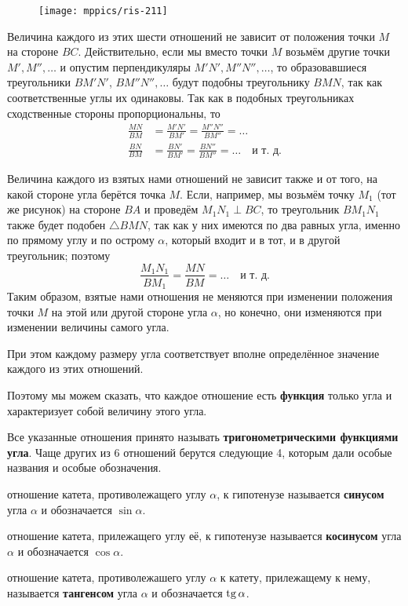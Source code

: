 \documentclass[oneside]{book}
\begin{document}
\begin{figure}
\centering
\texttt{[image: mppics/ris-211]}
\caption{}\label{1938/ris-211}
\end{figure}

Величина каждого из этих шести отношений не зависит от положения точки $M$ на стороне $BC$.
Действительно, если мы вместо точки $M$ возьмём другие точки $M', M'',\dots$
и опустим перпендикуляры $M'N', M''N'',\dots$, то образовавшиеся треугольники $BM'N'$,  $BM''N'',\dots$
будут подобны треугольнику $BMN$, так как соответственные углы их одинаковы.
Так как в подобных треугольниках сходственные стороны пропорциональны, то 
\begin{align*}
\frac{MN}{BM}&=\frac{M'N'}{BM'}=\frac{M''N''}{BM''}=\dots
\\
\frac{BN}{BM}&=\frac{BN'}{BM'}=\frac{BN''}{BM''}=\dots\quad\text{и т.~д.}
\end{align*}


Величина каждого из взятых нами отношений не зависит также и от того, на какой стороне угла берётся точка $M$.
Если, например, мы возьмём точку $M_1$ (тот же рисунок) на стороне $BA$ и проведём $M_1N_1\perp BC$, то треугольник $BM_1N_1$ также будет подобен $\triangle BMN$, так как у них имеются по два равных угла, именно по прямому углу и по острому $\alpha$, который входит и в тот, и в другой треугольник;
поэтому
\[\frac{M_1N_1}{BM_1}=\frac{MN}{BM}=\dots\quad\text{и т.~д.}\]
Таким образом, взятые нами отношения не меняются при изменении положения точки $M$ на этой или другой стороне угла $\alpha$, но конечно, они изменяются при изменении величины самого угла.

При этом каждому размеру угла соответствует вполне определённое значение каждого из этих отношений.

Поэтому мы можем сказать, что каждое отношение есть \textbf{функция} только угла и характеризует собой величину этого угла.

Все указанные отношения принято называть \textbf{тригонометрическими функциями угла}.
Чаще других из 6 отношений берутся следующие 4, которым дали особые названия и особые обозначения.

отношение катета, противолежащего углу $\alpha$, к гипотенузе называется \textbf{синусом} угла $\alpha$ и обозначается $\sin \alpha$.

отношение катета, прилежащего углу её, к гипотенузе называется \textbf{косинусом} угла $\alpha$ и обозначается $\cos\alpha$.

отношение катета, противолежашего углу $\alpha$ к катету, прилежащему к нему, называется \textbf{тангенсом} угла $\alpha$ и обозначается $\mathrm{tg}\,\alpha$.
\end{document}
